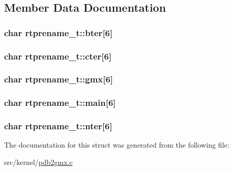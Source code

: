 \subsection{\-Member \-Data \-Documentation}
\hypertarget{structrtprename__t_a3a36dfc76b442bdfc21733b5a330f0c6}{
\subsubsection[{bter}]{\setlength{\rightskip}{0pt plus 5cm}char {\bf rtprename\-\_\-t\-::bter}\mbox{[}6\mbox{]}}}\label{structrtprename__t_a3a36dfc76b442bdfc21733b5a330f0c6}
\hypertarget{structrtprename__t_ab79541d0ed7593e9499e154eafdb4f6f}{
\subsubsection[{cter}]{\setlength{\rightskip}{0pt plus 5cm}char {\bf rtprename\-\_\-t\-::cter}\mbox{[}6\mbox{]}}}\label{structrtprename__t_ab79541d0ed7593e9499e154eafdb4f6f}
\hypertarget{structrtprename__t_a8ca6f528bdf4b3da71f1425702d4f852}{
\subsubsection[{gmx}]{\setlength{\rightskip}{0pt plus 5cm}char {\bf rtprename\-\_\-t\-::gmx}\mbox{[}6\mbox{]}}}\label{structrtprename__t_a8ca6f528bdf4b3da71f1425702d4f852}
\hypertarget{structrtprename__t_ae2a91f0df16a73d7c5bf2625efc22c34}{
\subsubsection[{main}]{\setlength{\rightskip}{0pt plus 5cm}char {\bf rtprename\-\_\-t\-::main}\mbox{[}6\mbox{]}}}\label{structrtprename__t_ae2a91f0df16a73d7c5bf2625efc22c34}
\hypertarget{structrtprename__t_ae906b43e06a7fd18095f5f808e2f6560}{
\subsubsection[{nter}]{\setlength{\rightskip}{0pt plus 5cm}char {\bf rtprename\-\_\-t\-::nter}\mbox{[}6\mbox{]}}}\label{structrtprename__t_ae906b43e06a7fd18095f5f808e2f6560}


\-The documentation for this struct was generated from the following file\-:\begin{DoxyCompactItemize}
\item 
src/kernel/\hyperlink{pdb2gmx_8c}{pdb2gmx.\-c}\end{DoxyCompactItemize}

